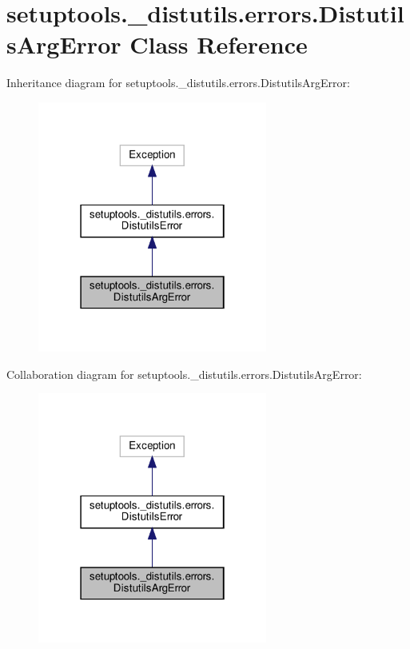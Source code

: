 \hypertarget{classsetuptools_1_1__distutils_1_1errors_1_1DistutilsArgError}{}\section{setuptools.\+\_\+distutils.\+errors.\+Distutils\+Arg\+Error Class Reference}
\label{classsetuptools_1_1__distutils_1_1errors_1_1DistutilsArgError}


Inheritance diagram for setuptools.\+\_\+distutils.\+errors.\+Distutils\+Arg\+Error\+:
\nopagebreak
\begin{figure}[H]
\begin{center}
\leavevmode
\includegraphics[width=214pt]{classsetuptools_1_1__distutils_1_1errors_1_1DistutilsArgError__inherit__graph}
\end{center}
\end{figure}


Collaboration diagram for setuptools.\+\_\+distutils.\+errors.\+Distutils\+Arg\+Error\+:
\nopagebreak
\begin{figure}[H]
\begin{center}
\leavevmode
\includegraphics[width=214pt]{classsetuptools_1_1__distutils_1_1errors_1_1DistutilsArgError__coll__graph}
\end{center}
\end{figure}


